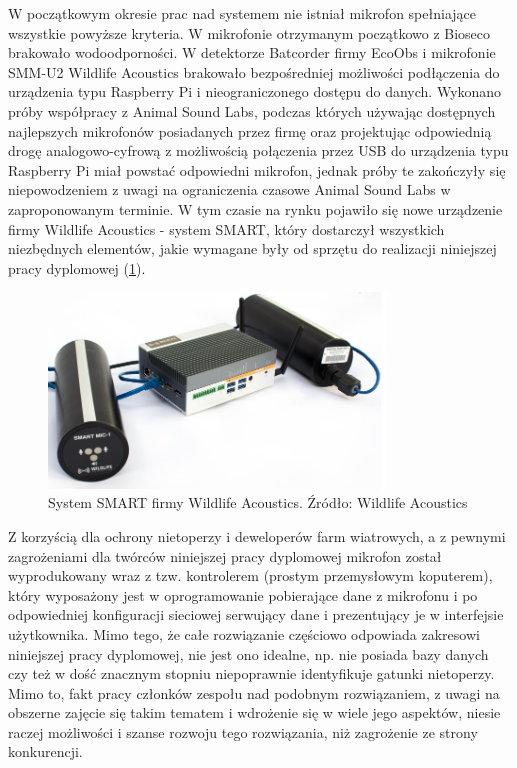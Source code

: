 \documentclass{sprz}
\begin{document}
W początkowym okresie prac nad systemem nie istniał mikrofon spełniające wszystkie powyższe kryteria. W mikrofonie otrzymanym początkowo z Bioseco brakowało wodoodporności. W detektorze Batcorder firmy EcoObs i mikrofonie SMM-U2 Wildlife Acoustics brakowało bezpośredniej możliwości podłączenia do urządzenia typu Raspberry Pi i nieograniczonego dostępu do danych. Wykonano próby współpracy z Animal Sound Labs, podczas których używając dostępnych najlepszych mikrofonów posiadanych przez firmę oraz projektując odpowiednią drogę analogowo-cyfrową z możliwością połączenia przez USB do urządzenia typu Raspberry Pi miał powstać odpowiedni mikrofon, jednak próby te zakończyły się niepowodzeniem z uwagi na ograniczenia czasowe Animal Sound Labs w zaproponowanym terminie. W tym czasie na rynku pojawiło się nowe urządzenie firmy Wildlife Acoustics - system SMART, który dostarczył wszystkich niezbędnych elementów, jakie wymagane były od sprzętu do realizacji niniejszej pracy dyplomowej (\ref{img:smart}). 

\begin{figure}[h]
  \centering
  \includegraphics[width=0.8\textwidth]{sprz/smart.png}
  \caption{System SMART firmy Wildlife Acoustics. Źródło: Wildlife Acoustics}
  \label{img:smart}
\end{figure} 

Z korzyścią dla ochrony nietoperzy i deweloperów farm wiatrowych, a z pewnymi zagrożeniami dla twórców niniejszej pracy dyplomowej mikrofon został wyprodukowany wraz z tzw. kontrolerem (prostym przemysłowym koputerem), który wyposażony jest w oprogramowanie pobierające dane z mikrofonu i po odpowiedniej konfiguracji sieciowej serwujący dane i prezentujący je w interfejsie użytkownika. Mimo tego, że całe rozwiązanie częściowo odpowiada zakresowi niniejszej pracy dyplomowej, nie jest ono idealne, np. nie posiada bazy danych czy też w dość znacznym stopniu niepoprawnie identyfikuje gatunki nietoperzy. Mimo to, fakt pracy członków zespołu nad podobnym rozwiązaniem, z uwagi na obszerne zajęcie się takim tematem i wdrożenie się w wiele jego aspektów, niesie raczej możliwości i szanse rozwoju tego rozwiązania, niż zagrożenie ze strony konkurencji.
\end{document}
